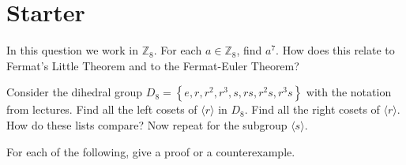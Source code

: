 \documentclass[answers]{exam}
\begin{document}
\section*{Starter}
\begin{questions}
\question%
In this question we work in $\mathbb{Z}_{8}$. For each $a \in \mathbb{Z}_{8}$, find $a^{7}$. How does this relate to Fermat's Little Theorem and to the Fermat-Euler Theorem?



\question%
Consider the dihedral group $D_{8}=\left\{e, r, r^{2}, r^{3}, s, r s, r^{2} s, r^{3} s\right\}$ with the notation from lectures. Find all the left cosets of $\langle r\rangle$ in $D_{8}$. Find all the right cosets of $\langle r\rangle$. How do these lists compare? Now repeat for the subgroup $\langle s\rangle$.



\question%
For each of the following, give a proof or a counterexample.

\end{questions}
\end{document}
